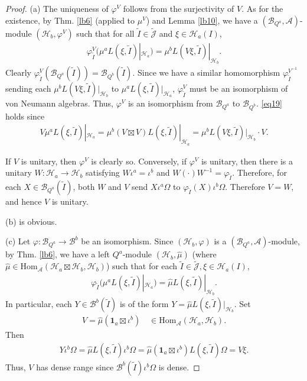 \documentclass[12pt,a4paper,notitlepage]{article}
\theoremstyle{definition}
\theoremstyle{plain}
\newcommand{\mc}{\mathcal}
\newcommand{\wtd}{\widetilde}
\newcommand{\wht}{\widehat}
\newcommand{\id}{\mathbf{1}}
\newcommand{\Hom}{\mathrm{Hom}}
\newcommand{\Jtd}{\widetilde{\mathcal J}}
\numberwithin{equation}{section}
\begin{document}
\begin{proof}
(a) The uniqueness of $\varphi^V$ follows from the surjectivity of $V$. As for the existence, by Thm. \ref{lb6} (applied to $\mu^V$) and Lemma \ref{lb10}, we have a $(\mc B_{Q^a},\mc A)$-module $(\mc H_b,\varphi^V)$ such that for all $\wtd I\in\Jtd$ and $\xi\in\mc H_a(I)$,
\begin{align}
\varphi^V_{\wtd I}\big(\mu^aL(\xi,\wtd I)|_{\mc H_a}\big)=\mu^b L(V\xi,\wtd I)|_{\mc H_b}.	
\end{align}
Clearly $\varphi^V_{\wtd I}(\mc B_{Q^a}(\wtd I))=\mc B_{Q^b}(\wtd I)$. Since we have a similar homomorphism $\varphi_{\wtd I}^{V^{-1}}$ sending each $\mu^b L(V\xi,\wtd I)|_{\mc H_b}$ to $\mu^aL(\xi,\wtd I)|_{\mc H_a}$, $\varphi^V_{\wtd I}$ must be an isomorphism of von Neumann algebras. Thus, $\varphi^V$ is an isomorphism from $\mc B_{Q^a}$ to $\mc B_{Q^b}$. \eqref{eq19} holds since
\begin{align*}
V\mu^a L(\xi,\wtd I)|_{\mc H_a}=\mu^b(V\boxtimes V)L(\xi,\wtd I)|_{\mc H_a}=\mu^b L(V\xi,\wtd I)|_{\mc H_b}\cdot V.	
\end{align*}

If $V$ is unitary, then $\varphi^V$ is clearly so. Conversely, if $\varphi^V$ is unitary, then there is a unitary  $W:\mc H_a\rightarrow\mc H_b$ satisfying $W\iota^a=\iota^b$ and $W(\cdot )W^{-1}=\varphi_{\wtd I}$. Therefore, for each $X\in\mc B_{Q^a}(\wtd I)$, both $W$ and $V$ send $X\iota^a\Omega$ to $\varphi_{\wtd I}(X)\iota^b\Omega$. Therefore $V=W$, and hence $V$ is unitary. 

(b) is obvious.

(c) Let $\varphi:\mc B_{Q^a}\rightarrow\mc B^b$ be an isomorphism. Since $(\mc H_b,\varphi)$ is a $(\mc B_{Q^a},\mc A)$-module, by Thm. \ref{lb6}, we have a left $Q^a$-module $(\mc H_b,\wht\mu)$ (where $\wht\mu\in\Hom_{\mc A}(\mc H_a\boxtimes\mc H_b,\mc H_b)$) such that for each $\wtd I\in\Jtd,\xi\in\mc H_a(I)$,
\begin{align*}
\varphi_{\wtd I}\big(\mu^aL(\xi,\wtd I)|_{\mc H_a}\big)=\wht\mu L(\xi,\wtd I)|_{\mc H_b}.	
\end{align*}
In particular, each $Y\in\mc B^b(\wtd I)$ is of the form $Y=\wht\mu L(\xi,\wtd I)|_{\mc H_b}$. Set
\begin{align}
V=\wht\mu(\id_a\boxtimes\iota^b)\quad\in\Hom_{\mc A}(\mc H_a,\mc H_b).	\label{eq21}
\end{align}
Then
\begin{align*}
Y\iota^b\Omega=	\wht\mu L(\xi,\wtd I)\iota^b\Omega=\wht\mu(\id_a\boxtimes\iota^b)L(\xi,\wtd I)\Omega=V\xi.
\end{align*}
Thus, $V$ has dense range since $\mc B^b(\wtd I)\iota^b\Omega$ is dense.


\end{proof}
\end{document}
